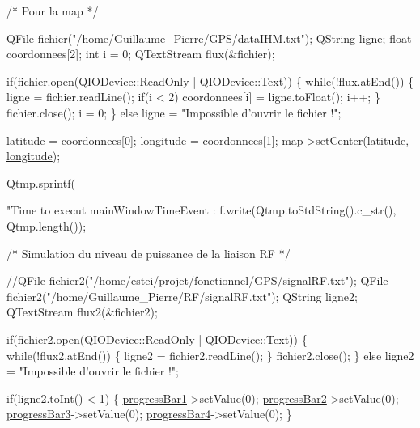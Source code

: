 \begin{DoxyCode}
    \textcolor{comment}{/* Pour la map */}

    QFile fichier(\textcolor{stringliteral}{"/home/Guillaume\_Pierre/GPS/dataIHM.txt"});
    QString ligne;
    \textcolor{keywordtype}{float} coordonnees[2];
    \textcolor{keywordtype}{int} i = 0;
    QTextStream flux(&fichier);

    \textcolor{keywordflow}{if}(fichier.open(QIODevice::ReadOnly | QIODevice::Text))
    \{
        \textcolor{keywordflow}{while}(!flux.atEnd())
        \{
            ligne = fichier.readLine();
            \textcolor{keywordflow}{if}(i < 2)
                coordonnees[i] = ligne.toFloat();
            i++;
        \}
        fichier.close();
        i = 0;
    \}
    \textcolor{keywordflow}{else}
        ligne = \textcolor{stringliteral}{"Impossible d'ouvrir le fichier !"};

    \hyperlink{classMainWindow_a8eb6f9adebecfb3cf78c566686f1f35e}{latitude} = coordonnees[0];
    \hyperlink{classMainWindow_ac7c0f22da72ad33678ff3d3e22c722c7}{longitude} = coordonnees[1];
    \hyperlink{classMainWindow_a2f9e7ca90c2813bd1969055871782cfb}{map}->\hyperlink{classLightMaps_a48a673b2f3167a02004ced0b182a8498}{setCenter}(\hyperlink{classMainWindow_a8eb6f9adebecfb3cf78c566686f1f35e}{latitude}, \hyperlink{classMainWindow_ac7c0f22da72ad33678ff3d3e22c722c7}{longitude});

    Qtmp.sprintf(\textcolor{stringliteral}{"Time to execut mainWindowTimeEvent : %
    f.write(Qtmp.toStdString().c\_str(), Qtmp.length());

    \textcolor{comment}{/* Simulation du niveau de puissance de la liaison RF */}

    \textcolor{comment}{//QFile fichier2("/home/estei/projet/fonctionnel/GPS/signalRF.txt");}
    QFile fichier2(\textcolor{stringliteral}{"/home/Guillaume\_Pierre/RF/signalRF.txt"});
    QString ligne2;
    QTextStream flux2(&fichier2);

    \textcolor{keywordflow}{if}(fichier2.open(QIODevice::ReadOnly | QIODevice::Text))
    \{
        \textcolor{keywordflow}{while}(!flux2.atEnd())
        \{
            ligne2 = fichier2.readLine();
        \}
        fichier2.close();
    \}
    \textcolor{keywordflow}{else}
        ligne2 = \textcolor{stringliteral}{"Impossible d'ouvrir le fichier !"};

    \textcolor{keywordflow}{if}(ligne2.toInt() < 1)
    \{
        \hyperlink{classMainWindow_a50d8f5aa716821eca4ad0a3bfb0cf2ec}{progressBar1}->setValue(0);
        \hyperlink{classMainWindow_a0594f2275ce1af436549e95cf62cfe7d}{progressBar2}->setValue(0);
        \hyperlink{classMainWindow_a4afea90f9ba8cd1d26fa3b552639a012}{progressBar3}->setValue(0);
        \hyperlink{classMainWindow_a8672c729ad5494d2890676bf07518ea2}{progressBar4}->setValue(0);
    \}

}
\end{DoxyCode}
